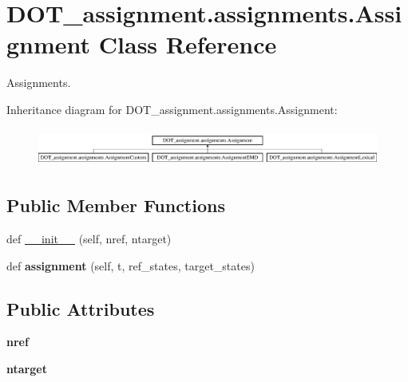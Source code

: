 \hypertarget{class_d_o_t__assignment_1_1assignments_1_1_assignment}{}\section{D\+O\+T\+\_\+assignment.\+assignments.\+Assignment Class Reference}
\label{class_d_o_t__assignment_1_1assignments_1_1_assignment}


Assignments.  


Inheritance diagram for D\+O\+T\+\_\+assignment.\+assignments.\+Assignment\+:\begin{figure}[H]
\begin{center}
\leavevmode
\includegraphics[height=1.261261cm]{class_d_o_t__assignment_1_1assignments_1_1_assignment}
\end{center}
\end{figure}
\subsection*{Public Member Functions}
\begin{DoxyCompactItemize}
\item 
def \mbox{\hyperlink{class_d_o_t__assignment_1_1assignments_1_1_assignment_a68df0627565c0ac579588ecfdb4783f5}{\+\_\+\+\_\+init\+\_\+\+\_\+}} (self, nref, ntarget)
\item 
\mbox{\label{class_d_o_t__assignment_1_1assignments_1_1_assignment_a10026ad41d6eefbb08548df35efc62f1}} 
def {\bfseries assignment} (self, t, ref\+\_\+states, target\+\_\+states)
\end{DoxyCompactItemize}
\subsection*{Public Attributes}
\begin{DoxyCompactItemize}
\item 
\mbox{\label{class_d_o_t__assignment_1_1assignments_1_1_assignment_a87cd83c06cfb06d060c8414fa7459c3b}} 
{\bfseries nref}
\item 
\mbox{\label{class_d_o_t__assignment_1_1assignments_1_1_assignment_a8e1fcecc0c547269133e783705bcca0d}} 
{\bfseries ntarget}
\end{DoxyCompactItemize}


